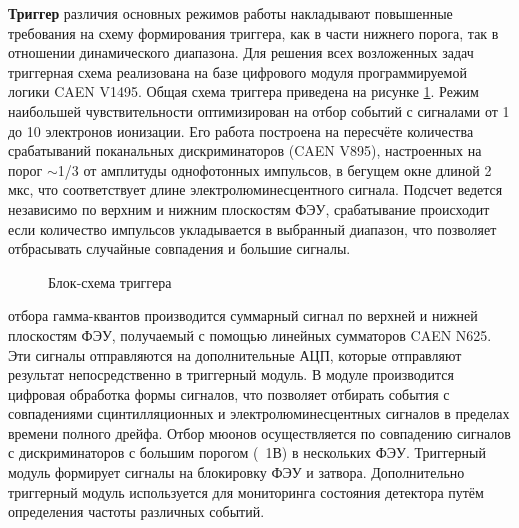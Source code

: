 \textbf{Триггер}
 различия основных режимов работы накладывают повышенные требования на схему формирования триггера, как в части нижнего порога, так в отношении динамического диапазона. Для решения всех возложенных задач триггерная схема реализована на базе цифрового модуля программируемой логики CAEN V1495. Общая схема триггера приведена на рисунке \ref{img:trigger}. Режим наибольшей чувствительности оптимизирован на отбор событий с сигналами от 1 до 10 электронов ионизации. Его работа построена на пересчёте количества срабатываний поканальных дискриминаторов (CAEN V895), настроенных на порог $\sim$1/3 от амплитуды однофотонных импульсов, в бегущем окне длиной 2 мкс, что соответствует длине электролюминесцентного сигнала. Подсчет ведется независимо по верхним и нижним плоскостям ФЭУ, срабатывание происходит если количество импульсов укладывается в выбранный диапазон, что позволяет отбрасывать случайные совпадения и большие сигналы.
\begin{figure}[H]
	\caption{Блок-схема триггера}
	\label{img:trigger}
\end{figure}
 отбора гамма-квантов производится суммарный сигнал по верхней и нижней плоскостям ФЭУ, получаемый с помощью линейных сумматоров CAEN N625. Эти сигналы отправляются на дополнительные АЦП, которые отправляют результат непосредственно в триггерный модуль. В модуле производится цифровая обработка формы сигналов, что позволяет отбирать события с совпадениями сцинтилляционных и электролюминесцентных сигналов в пределах времени полного дрейфа. Отбор мюонов осуществляется по совпадению сигналов с дискриминаторов с большим порогом (~1В) в нескольких ФЭУ. Триггерный модуль формирует сигналы на блокировку ФЭУ и затвора. Дополнительно триггерный модуль используется для мониторинга состояния детектора путём определения частоты различных событий.


